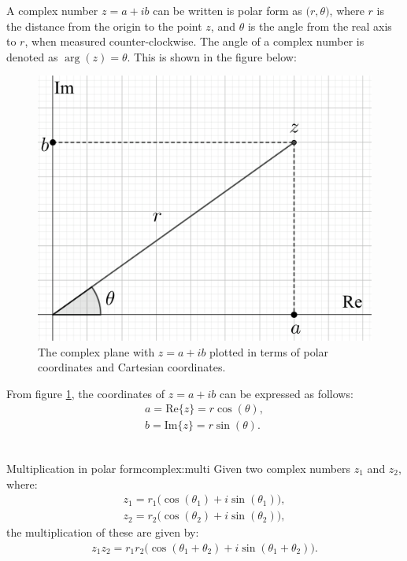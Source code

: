 \noindent A complex number $z=a+ib$ can be written is polar form as $\big(r,\theta\big)$, where $r$ is the distance from the origin to the point $z$, and $\theta$ is the angle from the real axis to $r$, when measured counter-clockwise. The angle of a complex number is denoted as $\arg(z)=\theta$. This is shown in the figure below:
\begin{figure}[H] 
\centering
\includegraphics[scale=0.15]{fig/img/complex_plan_polar}
\caption{The complex plane with $z=a+ib$ plotted in terms of polar coordinates and Cartesian coordinates.}
\label{fig:complex_plane_polar}
\end{figure}
\noindent
From figure \ref{fig:complex_plane_polar}, the coordinates of $z=a+ib$ can be expressed as follows:
\begin{align}
a=\text{Re}\{z\}=r\cos(\theta),
\\
b=\text{Im}\{z\}=r\sin(\theta).
\end{align}
\\

\begin{theorem}{Multiplication in polar form}{complex:multi}
Given two complex numbers $z_1$ and $z_2$, where:
\begin{align*}
z_1=r_1\big( \cos(\theta_1)+i\sin(\theta_1) \big), 
\\
z_2=r_2\big( \cos(\theta_2)+i\sin(\theta_2) \big),
\end{align*}
the multiplication of these are given by:
\begin{align}
z_1 z_2=r_1r_2\big( \cos(\theta_1+\theta_2)+ i \sin(\theta_1+\theta_2)\big). \label{pol:trig}
\end{align}
\end{theorem}


